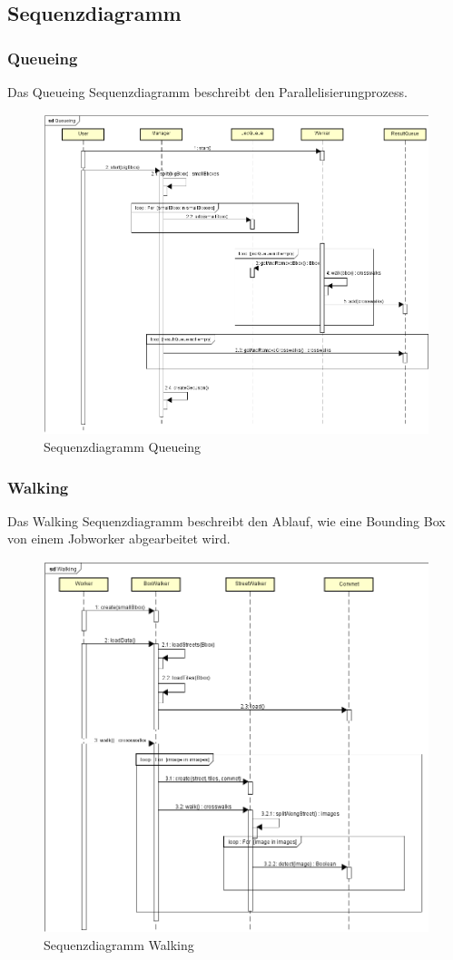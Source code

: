 \newpage
\subsection{Sequenzdiagramm}
\subsubsection{Queueing}
Das Queueing Sequenzdiagramm beschreibt den Parallelisierungprozess.
\\
\begin{figure}[H]
	\includegraphics[width=\textwidth]{images/seq_queueing.png}
	\caption{Sequenzdiagramm Queueing}
\end{figure}

\newpage
\subsubsection{Walking}
Das Walking Sequenzdiagramm beschreibt den Ablauf, wie eine Bounding Box von einem Jobworker abgearbeitet wird.
\\
\begin{figure}[H]
	\includegraphics[width=\textwidth]{images/seq_walking.png}
	\caption{Sequenzdiagramm Walking}
\end{figure}
\newpage